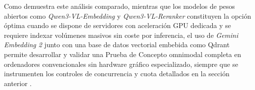 Como demuestra este análisis comparado, mientras que los modelos de pesos abiertos como \textit{Qwen3-VL-Embedding} y \textit{Qwen3-VL-Reranker} constituyen la opción óptima cuando se dispone de servidores con aceleración GPU dedicada y se requiere indexar volúmenes masivos sin coste por inferencia, el uso de \textit{Gemini Embedding 2} junto con una base de datos vectorial embebida como Qdrant permite desarrollar y validar una Prueba de Concepto omnimodal completa en ordenadores convencionales sin hardware gráfico especializado, siempre que se instrumenten los controles de concurrencia y cuota detallados en la sección anterior \cite{gemini_emb2_docs, qwen3_vl_emb2026}. %
